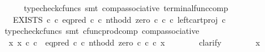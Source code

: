 \begin{isabellebody}
\ \ \ \ \isamarkupfalse%
\ {\isacharparenleft}{\kern0pt}typecheck{\isacharunderscore}{\kern0pt}cfuncs{\isacharcomma}{\kern0pt}\ smt\ comp{\isacharunderscore}{\kern0pt}associative{}\ terminal{\isacharunderscore}{\kern0pt}func{\isacharunderscore}{\kern0pt}comp{\isacharparenright}{\kern0pt}\isanewline
\ \ \isamarkupfalse%
\ \isamarkupfalse%
\ {\isachardoublequoteopen}{\isachardot}{\kern0pt}{\isachardot}{\kern0pt}{\isachardot}{\kern0pt}\ {\isacharequal}{\kern0pt}\ EXISTS\ {\isasymnat}\isactrlsub c\ {\isasymcirc}\isactrlsub c\ {\isacharparenleft}{\kern0pt}{\isacharparenleft}{\kern0pt}eq{\isacharunderscore}{\kern0pt}pred\ {\isasymnat}\isactrlsub c\ {\isasymcirc}\isactrlsub c\ {\isasymlangle}nth{\isacharunderscore}{\kern0pt}odd{\isacharcomma}{\kern0pt}\ zero\ {\isasymcirc}\isactrlsub c\ {\isasymbeta}\isactrlbsub {\isasymnat}\isactrlsub c\isactrlesub {\isasymrangle}{\isacharparenright}{\kern0pt}\ {\isasymcirc}\isactrlsub c\ left{\isacharunderscore}{\kern0pt}cart{\isacharunderscore}{\kern0pt}proj\ {\isasymnat}\isactrlsub c\ {\isasymone}{\isacharparenright}{\kern0pt}\isactrlsup {\isasymsharp}{\isachardoublequoteclose}\isanewline
\ \ \ \ \isamarkupfalse%
\ {\isacharparenleft}{\kern0pt}typecheck{\isacharunderscore}{\kern0pt}cfuncs{\isacharcomma}{\kern0pt}\ smt\ cfunc{\isacharunderscore}{\kern0pt}prod{\isacharunderscore}{\kern0pt}comp\ comp{\isacharunderscore}{\kern0pt}associative{}{\isacharparenright}{\kern0pt}\isanewline
\ \ \isamarkupfalse%
\ \isamarkupfalse%
\ {\isachardoublequoteopen}{\isachardot}{\kern0pt}{\isachardot}{\kern0pt}{\isachardot}{\kern0pt}\ {\isacharequal}{\kern0pt}\ {\isasymf}{\isachardoublequoteclose}\isanewline
\ \ \isamarkupfalse%
\ {\isacharminus}{\kern0pt}\isanewline
\ \ \ \ \isamarkupfalse%
\ {\isachardoublequoteopen}{\isasymnexists}\ x{\isachardot}{\kern0pt}\ x\ {\isasymin}\isactrlsub c\ {\isasymnat}\isactrlsub c\ {\isasymand}\ {\isacharparenleft}{\kern0pt}eq{\isacharunderscore}{\kern0pt}pred\ {\isasymnat}\isactrlsub c\ {\isasymcirc}\isactrlsub c\ {\isasymlangle}nth{\isacharunderscore}{\kern0pt}odd{\isacharcomma}{\kern0pt}\ zero\ {\isasymcirc}\isactrlsub c\ {\isasymbeta}\isactrlbsub {\isasymnat}\isactrlsub c\isactrlesub {\isasymrangle}{\isacharparenright}{\kern0pt}\ {\isasymcirc}\isactrlsub c\ x\ {\isacharequal}{\kern0pt}\ {\isasymt}{\isachardoublequoteclose}\isanewline
\ \ \ \ \isamarkupfalse%
\ clarify\isanewline
\ \ \ \ \ \ \isamarkupfalse%
\ x\isanewline

\end{isabellebody}
